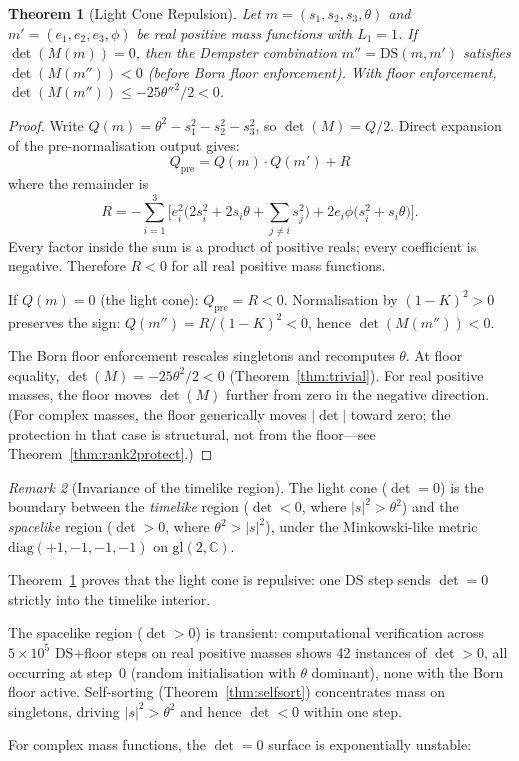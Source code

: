 \documentclass[11pt,a4paper]{article}
\newtheorem{theorem}{Theorem}[section]
\theoremstyle{definition}
\theoremstyle{remark}
\newtheorem{remark}[theorem]{Remark}
\newcommand{\C}{\mathbb{C}}
\begin{document}
\begin{theorem}[Light Cone Repulsion]\label{thm:lightcone}
Let $m=(s_1,s_2,s_3,\theta)$ and $m'=(e_1,e_2,e_3,\phi)$ be real positive mass functions with $L_1=1$. If $\det(M(m))=0$, then the Dempster combination $m''=\mathrm{DS}(m,m')$ satisfies $\det(M(m''))<0$ (before Born floor enforcement). With floor enforcement, $\det(M(m''))\leq -25\theta''^2/2 < 0$.
\end{theorem}

\begin{proof}
Write $Q(m)=\theta^2-s_1^2-s_2^2-s_3^2$, so $\det(M)=Q/2$. Direct expansion of the pre-normalisation output gives:
\[
Q_{\mathrm{pre}} = Q(m)\cdot Q(m') + R
\]
where the remainder is
\[
R = -\sum_{i=1}^{3}\Big[e_i^2\Big(2s_i^2+2s_i\theta+\sum_{j\neq i}s_j^2\Big)+2e_i\phi\big(s_i^2+s_i\theta\big)\Big].
\]
Every factor inside the sum is a product of positive reals; every coefficient is negative. Therefore $R<0$ for all real positive mass functions.

If $Q(m)=0$ (the light cone): $Q_{\mathrm{pre}}=R<0$. Normalisation by $(1-K)^2>0$ preserves the sign: $Q(m'')=R/(1-K)^2<0$, hence $\det(M(m''))<0$.

The Born floor enforcement rescales singletons and recomputes $\theta$. At floor equality, $\det(M)=-25\theta^2/2<0$ (Theorem~\ref{thm:trivial}). For real positive masses, the floor moves $\det(M)$ further from zero in the negative direction. (For complex masses, the floor generically moves $|\det|$ toward zero; the protection in that case is structural, not from the floor---see Theorem~\ref{thm:rank2protect}.)
\end{proof}

\begin{remark}[Invariance of the timelike region]\label{rem:timelike}
The light cone ($\det=0$) is the boundary between the \emph{timelike} region ($\det<0$, where $|s|^2>\theta^2$) and the \emph{spacelike} region ($\det>0$, where $\theta^2>|s|^2$), under the Minkowski-like metric $\mathrm{diag}(+1,-1,-1,-1)$ on $\mathrm{gl}(2,\C)$.

Theorem~\ref{thm:lightcone} proves that the light cone is repulsive: one DS step sends $\det=0$ strictly into the timelike interior.

The spacelike region ($\det>0$) is transient: computational verification across $5\times 10^5$ DS+floor steps on real positive masses shows 42 instances of $\det>0$, all occurring at step~0 (random initialisation with $\theta$ dominant), none with the Born floor active. Self-sorting (Theorem~\ref{thm:selfsort}) concentrates mass on singletons, driving $|s|^2>\theta^2$ and hence $\det<0$ within one step.

For complex mass functions, the $\det=0$ surface is exponentially unstable:
\end{remark}
\end{document}

